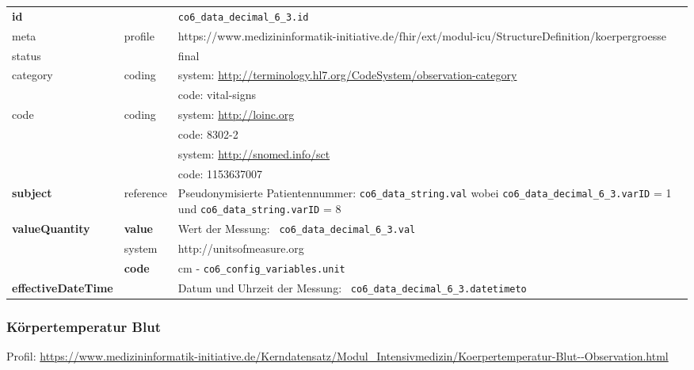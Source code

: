 \begin{longtable}{|l|l|p{7.5cm}|}
        \hline
        \rowcolor{lightgray} \multicolumn{3}{|l|}{Data Mapping (inhaltlich)} \\ \hline
        \textbf{id} &  & \texttt{co6\_data\_decimal\_6\_3.id} \\ \hline
	meta & profile & https://www.medizininformatik-initiative.de/fhir/ext/modul-icu/StructureDefinition/koerpergroesse \\ \hline 
	status &  & final   \\ \hline 
	category & coding & system: \url{http://terminology.hl7.org/CodeSystem/observation-category} \\
\cline{3-3}
	& & code: vital-signs \\ \hline
	code & coding & system: \url{http://loinc.org} \\ 
	\cline{3-3} 
	&  & code: 8302-2 \\ 
	\cline{3-3} 
	&  & system: \url{http://snomed.info/sct} \\ 
	\cline{3-3}
	&  & code: 1153637007 \\ \hline
	\textbf{subject} & reference & Pseudonymisierte Patientennummer: \texttt{co6\_data\_string.val} wobei \texttt{co6\_data\_decimal\_6\_3.varID} = 1 und \texttt{co6\_data\_string.varID} = 8 \\ \hline
	 \textbf{valueQuantity}  & \textbf{value} & Wert der Messung: \texttt{
co6\_data\_decimal\_6\_3.val} \\
        \cline{2-3}
         & system & http://unitsofmeasure.org \\
         \cline{2-3}
         & \textbf{code} & cm - \texttt{co6\_config\_variables.unit} \\ \hline
     \textbf{effectiveDateTime}  & & Datum und Uhrzeit der Messung: \texttt{
co6\_data\_decimal\_6\_3.datetimeto} \\ \hline
\end{longtable}


\subsubsection{Körpertemperatur Blut}

Profil: \url{https://www.medizininformatik-initiative.de/Kerndatensatz/Modul_Intensivmedizin/Koerpertemperatur-Blut--Observation.html}

\clearpage

